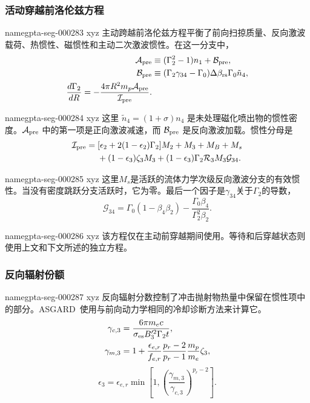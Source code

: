 \documentclass[twocolumn]{aastex702}
\makeatletter
\newcommand{\asgard}{\textsc{ASGARD}}
\providecommand{\gptareaderanchor}[1]{\pdfdest name{#1} xyz}%
\providecommand{\gptareaderanchor}[1]{\special{pdf:dest (#1) [ @thispage /XYZ @xpos @ypos null ]}}%
\makeatother
\begin{document}
\subsubsection{活动穿越前洛伦兹方程}


\gptareaderanchor{gpta-seg-000283}%
主动跨越前洛伦兹方程平衡了前向扫掠质量、反向激波载荷、热惯性、磁惯性和主动二次激波惯性。在这一分支中，
\begin{equation}
\begin{aligned}
\mathcal A_{\rm pre}
&\equiv(\Gamma_2^2-1)n_1+\mathcal B_{\rm pre},\\
\mathcal B_{\rm pre}
&\equiv(\Gamma_2\gamma_{34}-\Gamma_0)\Delta\beta_{\rm rs}
\Gamma_0\tilde n_4,\\
\frac{d\Gamma_2}{dR}
=-\frac{4\pi R^2m_p\mathcal A_{\rm pre}}{\mathcal I_{\rm pre}}.
\end{aligned}
\end{equation}

\gptareaderanchor{gpta-seg-000284}%
这里 \(\tilde n_4=(1+\sigma)n_4\) 是未处理磁化喷出物的惯性密度。\(\mathcal A_{\rm pre}\) 中的第一项是正向激波减速，而 \(\mathcal B_{\rm pre}\) 是反向激波加载。惯性分母是
\begin{equation}
\begin{split}
\mathcal I_{\rm pre}={}&
[\epsilon_2+2(1-\epsilon_2)\Gamma_2]M_2
+M_3+M_B+M_s \\
& +(1-\epsilon_3)\zeta_3M_3
+(1-\epsilon_3)\Gamma_2\mathcal R_3M_3\mathcal G_{34}.
\end{split}
\end{equation}

\gptareaderanchor{gpta-seg-000285}%
这里\(M_s\)是活跃的流体力学次级反向激波分支的有效惯性。当没有密度跳跃分支活跃时，它为零。最后一个因子是\(\gamma_{34}\)关于\(\Gamma_2\)的导数，
\begin{equation}
\mathcal G_{34}=
\Gamma_0(1-\beta_4\beta_2)
-\frac{\Gamma_0\beta_4}{\Gamma_2^2\beta_2}.
\end{equation}

\gptareaderanchor{gpta-seg-000286}%
该方程仅在主动前穿越期间使用。等待和后穿越状态则使用上文和下文所述的独立方程。

\subsubsection{反向辐射份额}


\gptareaderanchor{gpta-seg-000287}%
反向辐射分数控制了冲击抛射物热量中保留在惯性项中的部分。\asgard\ 使用与前向动力学相同的冷却诊断方法来计算它。
\begin{equation}
\begin{aligned}
\gamma_{c,3}&=\frac{6\pi m_ec}
{\sigma_{\rm es} B_3^{\prime 2}\Gamma_2t},\\
\gamma_{m,3}&=1+
\frac{\epsilon_{e,r}}{f_{e,r}}
\frac{p_r-2}{p_r-1}
\frac{m_p}{m_e}\zeta_3,
\end{aligned}
\end{equation}
\begin{equation}
\epsilon_3=\epsilon_{e,r}\min\left[
1,\left(\frac{\gamma_{m,3}}{\gamma_{c,3}}\right)^{p_r-2}
\right].
\end{equation}
\end{document}
